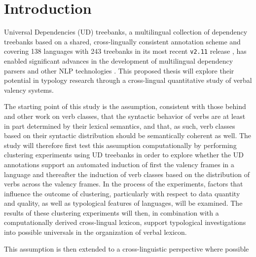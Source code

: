 \section{Introduction}\label{sec:intro}

Universal Dependencies (UD) treebanks, a multilingual collection of dependency treebanks based on a shared, cross-lingually consistent annotation scheme \citet{nivre2020} and covering 138 languages with 243 treebanks in its most recent \texttt{v2.11} release \cite{universaldep}, has enabled significant advances in the development of multilingual dependency parsers and other NLP technologies \citep{zeman2017, zeman2018}. This proposed thesis will explore their potential in typology research through a cross-lingual quantitative study of verbal valency systems.

The starting point of this study is the assumption, consistent with those behind \citet{levin1993} and other work on verb classes, that the syntactic behavior of verbs are at least in part determined by their lexical semantics, and that, as such, verb classes based on their syntactic distribution should be semantically coherent as well. The study will therefore first test this assumption computationally by performing clustering experiments using UD treebanks in order to explore whether the UD annotations support an automated induction of first the valency frames in a language and thereafter the induction of verb classes based on the distribution of verbs across the valency frames. In the process of the experiments, factors that influence the outcome of clustering, particularly with respect to data quantity and quality, as well as typological features of languages, will be examined. The results of these clustering experiments will then, in combination with a computationally derived cross-lingual lexicon, support typological investigations into possible universals in the organization of verbal lexicon.

This assumption is then extended to a cross-linguistic perspective where possible 